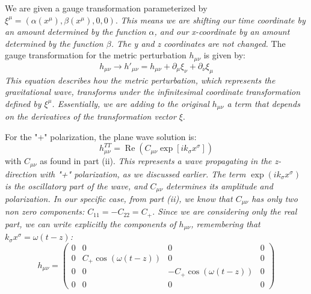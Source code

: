 We are given a gauge transformation parameterized by $\xi^{\mu} = (\alpha(x^{\mu}), \beta(x^{\mu}), 0, 0)$. \emph{This means we are shifting our time coordinate by an amount determined by the function $\alpha$, and our x-coordinate by an amount determined by the function $\beta$. The y and z coordinates are not changed.} The gauge transformation for the metric perturbation $h_{\mu \nu}$ is given by:
\begin{equation}
h_{\mu \nu} \to h'_{\mu\nu} = h_{\mu \nu} + \partial_{\mu} \xi_{\nu} + \partial_{\nu} \xi_{\mu}
\end{equation}
\emph{This equation describes how the metric perturbation, which represents the gravitational wave, transforms under the infinitesimal coordinate transformation defined by $\xi^{\mu}$. Essentially, we are adding to the original $h_{\mu\nu}$ a term that depends on the derivatives of the transformation vector $\xi$}.

For the "+" polarization, the plane wave solution is:
\begin{equation}
h_{\mu \nu}^{T T} = \operatorname{Re}\left(C_{\mu \nu} \exp \left[i k_{\sigma} x^{\sigma}\right]\right)
\end{equation}
with $C_{\mu \nu}$ as found in part (ii). \emph{This represents a wave propagating in the z-direction with "+" polarization, as we discussed earlier. The term $\exp(ik_{\sigma}x^{\sigma})$ is the oscillatory part of the wave, and $C_{\mu\nu}$ determines its amplitude and polarization. In our specific case, from part (ii), we know that $C_{\mu\nu}$ has only two non zero components: $C_{11} = -C_{22}=C_{+}$. Since we are considering only the real part, we can write explicitly the components of $h_{\mu\nu}$, remembering that $k_{\sigma}x^{\sigma}=\omega(t-z)$:}
\begin{equation}
h_{\mu \nu} = \begin{pmatrix}
0 & 0 & 0 & 0 \\
0 & C_{+}\cos(\omega(t-z)) & 0 & 0 \\
0 & 0 & -C_{+}\cos(\omega(t-z)) & 0 \\
0 & 0 & 0 & 0
\end{pmatrix}
\end{equation}


